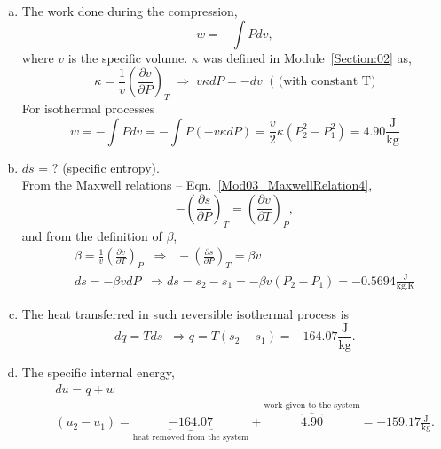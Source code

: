 \documentclass[12pts,a4paper,amsmath,amssymb,floatfix]{article}%
\newcommand{\frc}{\displaystyle\frac}
\begin{document}
\begin{enumerate}[1)]
       \begin{enumerate}[a)]
%
            \item The work done during the compression,
                \begin{displaymath}
                   w = -\int P dv,
                \end{displaymath}
                where $v$ is the specific volume. $\kappa$ was defined in Module~\ref{Section:02} as,
                \begin{displaymath}
                   \kappa = \frc{1}{v}\left(\frc{\partial v}{\partial P}\right)_{T}\;\Longrightarrow \; v\kappa dP = - dv \;\;\text{( (with constant T)}
                \end{displaymath}
                For isothermal processes
                \begin{displaymath}
                   w = -\int P dv = - \int P\left(-v\kappa dP\right) = \frc{v}{2}\kappa\left(P_{2}^{2}-P_{1}^{2}\right) = 4.90 \frc{\text{J}}{\text{kg}}
                \end{displaymath}
%
            \item $ds$ = ? (specific entropy).\\
                  From the Maxwell relations -- Eqn.~\ref{Mod03_MaxwellRelation4}, 
                \begin{displaymath}
                   -\left(\frc{\partial s}{\partial P}\right)_{T} = \left(\frc{\partial v}{\partial T}\right)_{P},
                \end{displaymath}
                and from the definition of $\beta$,
                \begin{eqnarray}
                    && \beta = \frc{1}{v}\left(\frc{\partial v}{\partial T}\right)_{P} \;\;\Longrightarrow\;\; -\left(\frc{\partial s}{\partial P}\right)_{T} = \beta v \nonumber \\
                    && ds = -\beta v dP \;\;\Longrightarrow ds = s_{2}-s_{1} = -\beta v \left(P_{2}-P_{1}\right) = -0.5694 \frc{\text{J}}{\text{kg.K}} \nonumber
                \end{eqnarray}
%
            \item The heat transferred in such reversible isothermal process is
                \begin{displaymath}
                   dq = Tds \;\;\Longrightarrow q = T\left(s_{2}-s_{1}\right) = -164.07 \frc{\text{J}}{\text{kg}}.
                \end{displaymath}
%
            \item The specific internal energy,
                \begin{eqnarray}
                   &&  du = q + w \nonumber \\
                   && \left(u_{2}-u_{1}\right) = \underbrace{-164.07}_{\text{heat removed from the system}} + \overbrace{4.90}^{\text{work given to the system}} = -159.17 \frc{\text{J}}{\text{kg}}. \nonumber
                \end{eqnarray}
 
%
       \end{enumerate} 

\end{enumerate}
\end{document}
